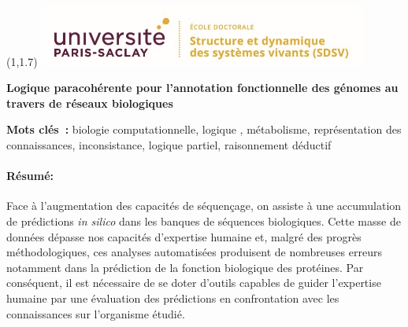 \documentclass[univ]{thesis}
\begin{document}
    \thispagestyle{empty}
    \begin{textblock}{3}(1,1.7)
        \includegraphics[height=2cm]{img/logo_ecole_doctorale.png}
    \end{textblock}
    \begin{mdframed}[linecolor=psviolet, linewidth=2pt, innerleftmargin=10, innerrightmargin=30, innertopmargin=10, innerbottommargin=50, font=\tiny]
        {\small \textbf{Logique paracohérente pour l’annotation fonctionnelle des génomes au travers de réseaux biologiques}}
        
        \noindent\textbf{Mots clés :} biologie computationnelle, logique , métabolisme, représentation des connaissances, inconsistance, logique partiel, raisonnement déductif
        
        \begin{multicols}{2}            
            \paragraph*{\textbf{Résumé:} }Face à l’augmentation des capacités de séquençage, on assiste à une accumulation de prédictions \textit{in silico} dans les banques de séquences biologiques. Cette masse de données dépasse nos capacités d’expertise humaine et, malgré des progrès méthodologiques, ces analyses automatisées produisent de nombreuses erreurs notamment dans la prédiction de la fonction biologique des protéines. Par conséquent, il est nécessaire de se doter d’outils capables de guider l’expertise humaine par une évaluation des prédictions en confrontation avec les connaissances sur l’organisme étudié. 
            

\end{multicols}
\end{mdframed}
\end{document}
